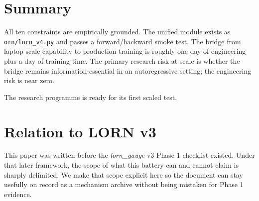 \documentclass[10pt, twocolumn, a4paper]{article}
\begin{document}
\section{Summary}

All ten constraints are empirically grounded. The unified module exists as \texttt{orn/lorn\_v4.py} and passes a forward/backward smoke test. The bridge from laptop-scale capability to production training is roughly one day of engineering plus a day of training time. The primary research risk at scale is whether the bridge remains information-essential in an autoregressive setting; the engineering risk is near zero.

The research programme is ready for its first scaled test.


\section*{Relation to LORN v3}

This paper was written before the \emph{lorn\_gauge} v3 Phase 1 checklist existed. Under that later framework, the scope of what this battery can and cannot claim is sharply delimited. We make that scope explicit here so the document can stay usefully on record as a mechanism archive without being mistaken for Phase 1 evidence.
\end{document}
